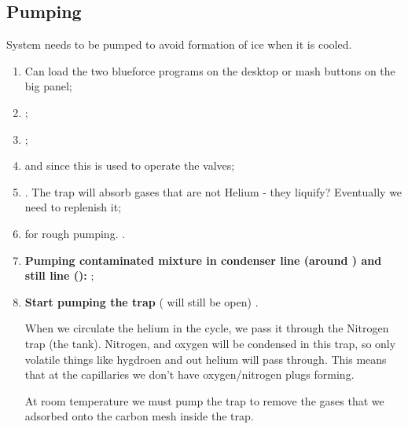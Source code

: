 \subsection{Pumping}
System needs to be pumped to avoid formation of ice when it is cooled.
\begin{enumerate}
\item  Can load  the  two blueforce  programs on  the  desktop or  mash
  buttons on the big panel;
\item {};
\item {};
\item {}
  and    since this  is used  to operate  the
  valves;
\item {}.   The trap will
  absorb gases that are not Helium  - they liquify?  Eventually we need
  to replenish it;
\item {}  for rough
  pumping. .
\item \textbf{Pumping  contaminated mixture  in condenser  line (around
    ) and  still line  ():} ;
\item \textbf{Start  pumping the  trap}  ( will still be open) \ira {}.

  When we  circulate the helium  in the cycle,  we pass it  through the
  Nitrogen trap (the tank).  Nitrogen,  and oxygen will be condensed in
  this trap, so only volatile things  like hygdroen and out helium will
  pass  through.  This  means that  at  the capillaries  we don't  have
  oxygen/nitrogen plugs forming.

  At room temperature we must pump the trap to remove the gases that we
  adsorbed onto the carbon mesh inside the trap.

  \begin{framed}\noindent
  \end{framed}


\end{enumerate}
